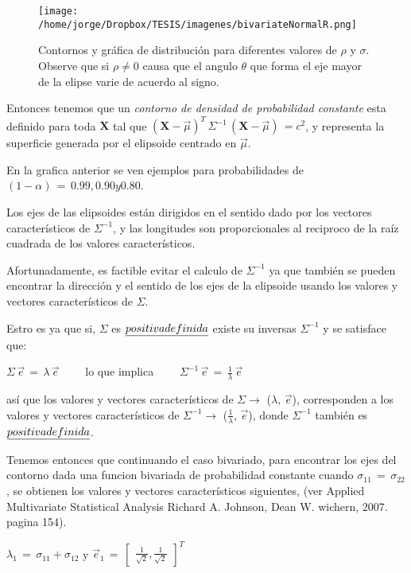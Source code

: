 \documentclass[english]{report}
\begin{document}
\begin{figure}[H]
\centering
\texttt{[image: /home/jorge/Dropbox/TESIS/imagenes/bivariateNormalR.png]}
\caption{Contornos y gráfica de distribución para diferentes valores de $\rho$ y $\sigma$. Observe que si $\rho \neq 0$ causa que el angulo $\theta$ que forma el eje mayor de la elipse varie de acuerdo al signo.}
\label{c2f4}
\end{figure}


Entonces tenemos que un \emph{contorno de densidad de probabilidad constante} esta definido para toda $\textbf{X}$ tal que $(\textbf{X}-\vec{\mu})^T\,\Sigma^{-1}\,(\textbf{X}-\vec{\mu})\,=c^2$, y representa la superficie generada por el elipsoide centrado en $\vec{\mu}$.

En la grafica anterior se ven ejemplos para probabilidades de $(1-\alpha)\, =\, 0.99, 0.90 y 0.80$.

Los ejes de las elipsoides están dirigidos en el sentido dado por los vectores característicos de $\Sigma^{-1}$, y las longitudes son proporcionales al reciproco de la raíz cuadrada de los valores característicos.

Afortunadamente, es factible evitar el calculo de $\Sigma^{-1}$ ya que también se pueden encontrar la dirección y el sentido de los ejes de la elipsoide usando los valores y vectores característicos de $\Sigma$.

Estro es ya que si, $\Sigma$ es $\emph{positiva definida}$  existe su inversas $\Sigma^{-1}$ y se satisface que:


$\Sigma\,\vec{e}\,=\,\lambda\,\vec{e}\qquad$ lo que implica $\qquad\Sigma^{-1}\,\vec{e}\,=\,\frac{1}{\lambda}\,\vec{e}$


así que los valores y vectores característicos de $\Sigma\rightarrow$ ($\lambda,\,\vec{e}$), corresponden a los valores y vectores característicos de $\Sigma^{-1}\rightarrow$ ($\frac{1}{\lambda},\,\vec{e}$), donde $\Sigma^{-1}$ también es $\emph{positiva definida}$.


Tenemos entonces que continuando el caso bivariado, para encontrar los ejes del contorno dada una funcion bivariada de probabilidad constante cuando $\sigma_{11}\,=\,\sigma_{22}$, se obtienen los valores y vectores característicos siguientes, (ver Applied Multivariate Statistical Analysis Richard A. Johnson, Dean W. wichern, 2007. pagina 154).

$\lambda_1\,=\,\sigma_{11}+\sigma_{12}$ y $\vec{e}_1\,=\,\begin{bmatrix}
\frac{1}{\sqrt{2}},
\frac{1}{\sqrt{2}}
\end{bmatrix}^T$
\end{document}
